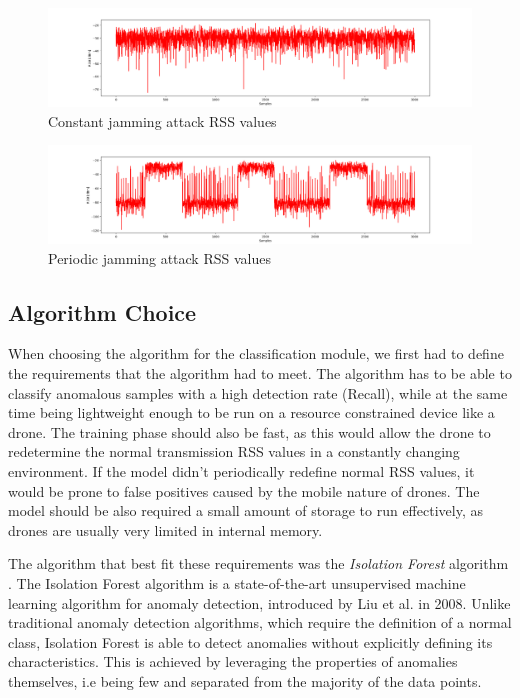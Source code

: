 \documentclass[futureinternet,article,submit,pdftex,moreauthors]{Definitions/mdpi}
\begin{document}
\begin{figure}[H]
	\includegraphics[width=10.5 cm]{img/ConstantJammingSignal.png}
	\caption{Constant jamming attack RSS values}
	\label{fig:ConstantJammingSignal}
\end{figure}   
\unskip
\begin{figure}[H]
	\includegraphics[width=10.5 cm]{img/PeriodicJammingSignal.png}
	\caption{Periodic jamming attack RSS values}
	\label{fig:PeriodicJammingSignal}
\end{figure}   
\unskip

\subsection {Algorithm Choice}

When choosing the algorithm for the classification module, we first had to define the requirements that the algorithm had to meet. The algorithm has to be able to classify anomalous samples with a high detection rate (Recall), while at the same time 
being lightweight enough to be run on a resource constrained device like a drone. The training phase should also be fast, as this would allow the drone to redetermine the normal transmission RSS values in a constantly changing environment. If the model didn't periodically redefine normal RSS values, 
it would be prone to false positives caused by the mobile nature of drones. 
The model should be also required a small amount of storage to run effectively, as drones are usually very limited in internal memory. 

The algorithm that best fit these requirements was the \textit{Isolation Forest} algorithm \cite{IsolationForestLiu}. The Isolation Forest algorithm is a state-of-the-art unsupervised machine learning algorithm for anomaly detection, introduced by Liu et al. in 2008. 
Unlike traditional anomaly detection algorithms, which require the definition of a normal class, Isolation Forest is able to detect anomalies without explicitly defining its characteristics.
This is achieved by leveraging the properties of anomalies themselves, i.e being few and separated from the majority of the data points. 
\end{document}
